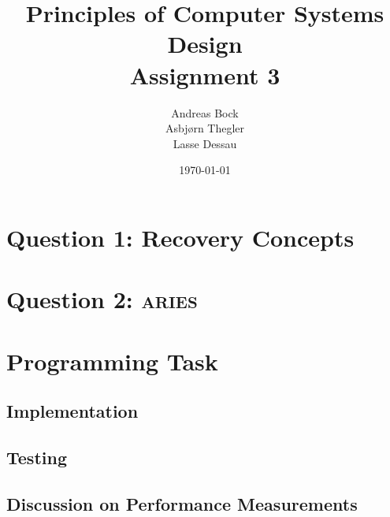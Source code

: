 \documentclass[11pt]{article}
\def\Author{Andreas Bock\\
Asbj\o rn Thegler\\
Lasse Dessau
}
\def\Title{\bf Principles of Computer Systems Design\\ {\Large Assignment 3}}
\begin{document}
\title{\Title}
\author{\Author}
\date{\today}
\maketitle

\section*{Question 1: Recovery Concepts}

\section*{Question 2: \textsc{aries}}

\section*{Programming Task}

\subsection*{Implementation}

\subsection*{Testing}

\subsection*{Discussion on Performance Measurements}
\end{document}
